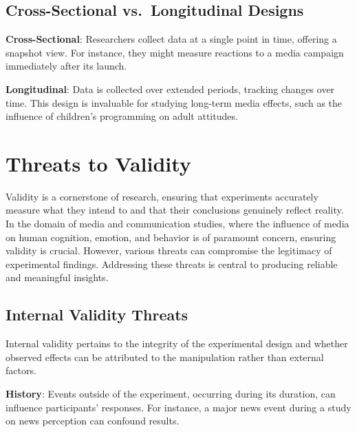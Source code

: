 \documentclass[
  b5paper]{book}
\begin{document}
\hypertarget{cross-sectional-vs.-longitudinal-designs}{%
\subsection*{Cross-Sectional vs.~Longitudinal Designs}\label{cross-sectional-vs.-longitudinal-designs}}

\textbf{Cross-Sectional}: Researchers collect data at a single point in time, offering a snapshot view. For instance, they might measure reactions to a media campaign immediately after its launch.

\textbf{Longitudinal}: Data is collected over extended periods, tracking changes over time. This design is invaluable for studying long-term media effects, such as the influence of children's programming on adult attitudes.

\hypertarget{threats-to-validity}{%
\section{Threats to Validity}\label{threats-to-validity}}

Validity is a cornerstone of research, ensuring that experiments accurately measure what they intend to and that their conclusions genuinely reflect reality. In the domain of media and communication studies, where the influence of media on human cognition, emotion, and behavior is of paramount concern, ensuring validity is crucial. However, various threats can compromise the legitimacy of experimental findings. Addressing these threats is central to producing reliable and meaningful insights.

\hypertarget{internal-validity-threats}{%
\subsection*{Internal Validity Threats}\label{internal-validity-threats}}

Internal validity pertains to the integrity of the experimental design and whether observed effects can be attributed to the manipulation rather than external factors.

\textbf{History}: Events outside of the experiment, occurring during its duration, can influence participants' responses. For instance, a major news event during a study on news perception can confound results.
\end{document}
